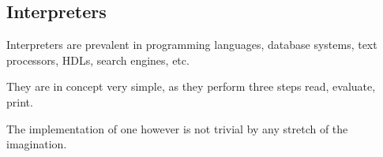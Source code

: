 \newpage
\subsection{Interpreters}
Interpreters are prevalent in programming languages, database systems, text processors, HDLs, search engines, etc.

They are in concept very simple, as they perform three steps read, evaluate, print.

The implementation of one however is not trivial by any stretch of the imagination.
